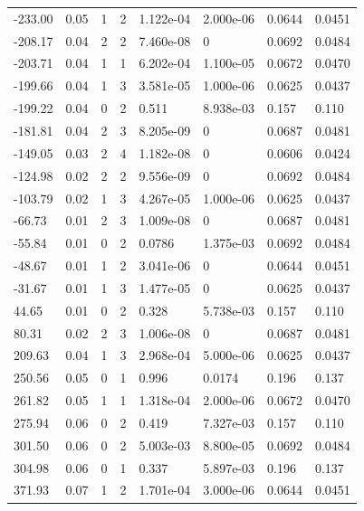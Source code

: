 \documentclass[preview]{standalone}
\begin{document}
{{\begin{tabular}{L{1.2cm}C{1.2cm} C{0.3cm}C{0.5cm} C{1.4cm}C{1.4cm} C{1.4cm}C{1.4cm}}
  -233.00  &  0.05  & 1     &  2 &  1.122e-04  & 2.000e-06  & 0.0644 &  0.0451   \\ 
  -208.17  &  0.04  & 2     &  2 &  7.460e-08  & 0  & 0.0692 &  0.0484   \\ 
  -203.71  &  0.04  & 1     &  1 &  6.202e-04  & 1.100e-05  & 0.0672 &  0.0470   \\ 
  -199.66  &  0.04  & 1     &  3 &  3.581e-05  & 1.000e-06  & 0.0625 &  0.0437   \\ 
  -199.22  &  0.04  & 0     &  2 &  0.511  & 8.938e-03  & 0.157 &  0.110   \\ 
  -181.81  &  0.04  & 2     &  3 &  8.205e-09  & 0  & 0.0687 &  0.0481   \\ 
  -149.05  &  0.03  & 2     &  4 &  1.182e-08  & 0  & 0.0606 &  0.0424   \\ 
  -124.98  &  0.02  & 2     &  2 &  9.556e-09  & 0  & 0.0692 &  0.0484   \\ 
  -103.79  &  0.02  & 1     &  3 &  4.267e-05  & 1.000e-06  & 0.0625 &  0.0437   \\ 
  -66.73  &  0.01  & 2     &  3 &  1.009e-08  & 0  & 0.0687 &  0.0481   \\ 
  -55.84  &  0.01  & 0     &  2 &  0.0786  & 1.375e-03  & 0.0692 &  0.0484   \\ 
  -48.67  &  0.01  & 1     &  2 &  3.041e-06  & 0  & 0.0644 &  0.0451   \\ 
  -31.67  &  0.01  & 1     &  3 &  1.477e-05  & 0  & 0.0625 &  0.0437   \\ 
  44.65  &  0.01  & 0     &  2 &  0.328  & 5.738e-03  & 0.157 &  0.110   \\ 
  80.31  &  0.02  & 2     &  3 &  1.006e-08  & 0  & 0.0687 &  0.0481   \\ 
  209.63  &  0.04  & 1     &  3 &  2.968e-04  & 5.000e-06  & 0.0625 &  0.0437   \\ 
  250.56  &  0.05  & 0     &  1 &  0.996  & 0.0174  & 0.196 &  0.137   \\ 
  261.82  &  0.05  & 1     &  1 &  1.318e-04  & 2.000e-06  & 0.0672 &  0.0470   \\ 
  275.94  &  0.06  & 0     &  2 &  0.419  & 7.327e-03  & 0.157 &  0.110   \\ 
  301.50  &  0.06  & 0     &  2 &  5.003e-03  & 8.800e-05  & 0.0692 &  0.0484   \\ 
  304.98  &  0.06  & 0     &  1 &  0.337  & 5.897e-03  & 0.196 &  0.137   \\ 
  371.93  &  0.07  & 1     &  2 &  1.701e-04  & 3.000e-06  & 0.0644 &  0.0451   \\ 

\end{tabular}}}
\end{document}
